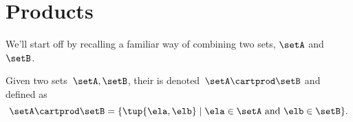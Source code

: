 

\section{Products}
\label{sec:combination-products}

We'll start off by recalling a familiar way of combining two sets, $\setA$ and $\setB$.


\begin{definition}
  \label{def:cartesian-product}
  Given two sets~$\setA,\setB$, their \emph{} is denoted~$\setA \cartprod  \setB$ and defined as
  \begin{equation*}
    \setA \cartprod \setB =\{ \tup{\ela,\elb}\mid \ela \in \setA \text{ and } \elb \in \setB \}.
  \end{equation*}
\end{definition}


